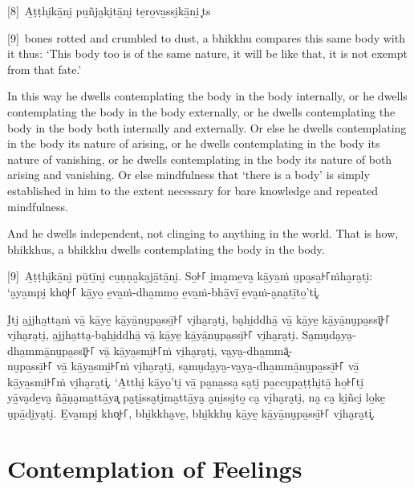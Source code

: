 [8]~A̱ṭṭhi̮kā̱ni̮ pu̱ñja̮ki̮tā̱ni̮ te̱ro̱va̱ssi̮kā̱ni̱~\ldo͓ts{}

\englishPage

[9]~bones rotted and crumbled to dust, a bhikkhu compares this same
body with it thus: ‘This body too is of the same nature, it will be like that,
it is not exempt from that fate.’

In this way he dwells contemplating the body in the body internally, or he
dwells contemplating the body in the body externally, or he dwells contemplating
the body in the body both internally and externally. Or else he dwells
contemplating in the body its nature of arising, or he dwells contemplating in
the body its nature of vanishing, or he dwells contemplating in the body its
nature of both arising and vanishing. Or else mindfulness that ‘there is a body’
is simply established in him to the extent necessary for bare knowledge and
repeated mindfulness.

And he dwells independent, not clinging to anything in the world. That is how,
bhikkhus, a bhikkhu dwells contemplating the body in the body.



\paliPage

[9]~A̱ṭṭhi̮kā̱ni̮ pū̱tī̱ni̮ cu̱ṇṇa̮ka̮jā̱tā̱ni̮. So̱꜔꜒ i̮ma̮me̱va̮ kā̱ya̱ṁ u̮pa̮sa̱꜔꜒ṁha̮ra̮ti̮: ‘a̮ya̱mpi̮ kho͓꜔꜒
kā̱yo̱ e̱va̱ṁ-dha̱mmo̱ e̱va̱ṁ-bhā̱vī̱ e̱va̮ṁ-a̮na̮tī̱to̱’ti͓.

I̮ti̮ a̱jjha̱tta̱ṁ vā̱ kā̱ye̱ kā̱yā̱nu̮pa̱ssī̱꜔꜒ vi̮ha̮ra̮ti̮, ba̮hi̱ddhā̱ vā̱ kā̱ye̱ kā̱yā̱nu̮pa̱ssī͓꜔꜒
vi̮ha̮ra̮ti̮, a̱jjha̱tta̮-ba̮hi̱ddhā̱ vā̱ kā̱ye̱ kā̱yā̱nu̮pa̱ssī̱꜔꜒ vi̮ha̮ra̮ti̮. Sa̮mu̮da̮ya̮-dha̱mmā̱nu̮pa̱ssī͓꜔꜒
vā̱ kā̱ya̱smi̱꜔꜒ṁ vi̮ha̮ra̮ti̮, va̮ya̮-dha̱mmā͓-\\
nu̮pa̱ssī̱꜔꜒ vā̱ kā̱ya̱smi̱꜔꜒ṁ vi̮ha̮ra̮ti̮, sa̮mu̮da̮ya̮-va̮ya̮-dha̱mmā̱nu̮pa̱ssī̱꜔꜒ vā̱ kā̱ya̱smi̱꜔꜒ṁ vi̮ha̮ra̮ti͓.
‘A̱tthi̮ kā̱yo̱’ti̮ vā̱ pa̮na̱ssa̮ sa̮ti̮ pa̱ccu̮pa̱ṭṭhi̮tā̱ ho̱꜔꜒ti̮ yā̱va̮de̱va̮ ñā̱ṇa̮ma̱ttā̱ya͓
pa̮ṭi̱ssa̮ti̮ma̱ttā̱ya̮ a̮ni̱ssi̮to̱ ca̮ vi̮ha̮ra̮ti̮, na̮ ca̮ ki̱ñci̮ lo̱ke̱ u̮pā̱di̮ya̮ti̮. E̱va̱mpi̮ kho͓꜔꜒,
bhi̱kkha̮ve̱, bhi̱kkhu̮ kā̱ye̱ kā̱yā̱nu̮pa̱ssī̱꜔꜒ vi̮ha̮ra̮ti͓.



\englishPage
\chapter{Contemplation of Feelings}

